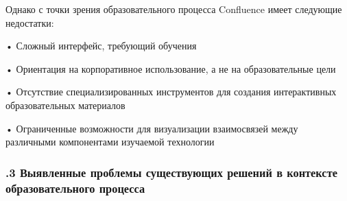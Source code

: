 {  \par \redline Однако с точки зрения образовательного процесса Confluence имеет следующие недостатки:
  
  \par \redline • Сложный интерфейс, требующий обучения
  \par \redline • Ориентация на корпоративное использование, а не на образовательные цели
  \par \redline • Отсутствие специализированных инструментов для создания интерактивных образовательных материалов
  \par \redline • Ограниченные возможности для визуализации взаимосвязей между различными компонентами изучаемой технологии

  \par
}

\subtitlespace

\subsubsection*{ 
  \gostTitleFont
  .3 Выявленные проблемы существующих решений в контексте образовательного процесса
} 

\subtitlespace

